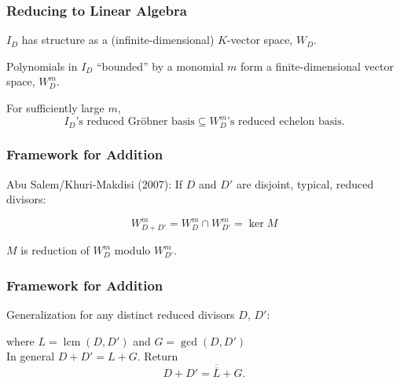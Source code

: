 \documentclass{beamer}
\DeclareMathOperator{\im}{im}
\DeclareMathOperator{\lcm}{lcm}
\renewcommand{\bar}{\overline}
\begin{document}

\begin{frame}
\frametitle{Reducing to Linear Algebra}
  $I_D$ has structure as a (infinite-dimensional) $K$-vector space, $W_D$.
  
  \vspace{10pt}
  Polynomials in $I_D$ ``bounded'' by a monomial $m$ form a finite-dimensional vector space, $W_D^m$.
  
  \vspace{10pt}
  For sufficiently large $m$,
  \[ \text{$I_D$'s reduced Gr\"obner basis} \subseteq \text{$W_D^m$'s reduced echelon basis}. \]
\end{frame}


\begin{frame}[fragile]
\frametitle{Framework for Addition}
  Abu Salem/Khuri-Makdisi (2007): If $D$ and $D'$ are disjoint, typical, reduced divisors:
  \vspace{10pt}
  \begin{center}
  \end{center}

  \[ W_{D + D'}^m = W_D^m \cap W_{D'}^m = \ker M \]
  
  \vspace{10pt}
  $M$ is reduction of $W_D^m$ modulo $W_{D'}^m$.\\
\end{frame}


\begin{frame}[fragile]
\frametitle{Framework for Addition}
  Generalization for any distinct reduced divisors $D$, $D'$:
  \begin{center}
  \end{center}
  where $L = \lcm(D, D')$ and $G = \gcd(D, D')$\\
  \vspace{10pt}
  In general $D + D' = L + G$. Return\\
  \[D + D' = \bar{\bar L} + G.\]
\end{frame}
\end{document}
